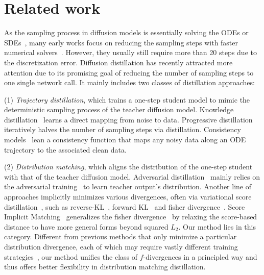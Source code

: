 \section{Related work}
\vspace{-3pt}

As the sampling process in diffusion models is essentially solving the ODEs or SDEs~\citep{song2020score}, many early works focus on reducing the sampling steps with faster numerical solvers~\citep{Song2020DenoisingDI,lu2022dpmp,Karras2022ElucidatingTD,liu2022pseudo,zheng2024dpm}. However, they usually still require more than 20 steps due to the discretization error. Diffusion distillation has recently attracted more attention due to its promising goal of reducing the number of sampling steps to one single network call. 
It mainly includes two classes of distillation approaches: 

(1) \emph{Trajectory distillation}, which trains a one-step student model to mimic the deterministic sampling process of the teacher diffusion model. Knowledge distillation~\citep{luhman2021knowledge,zheng2022fast} learns a direct mapping from noise to data. Progressive distillation~\cite{salimans2022progressive,meng2023distillation} iteratively halves the number of sampling steps via distillation. Consistency models~\citep{song2023consistency,song2023improved,geng2024consistency,lee2024truncated,lu2024simplifying} lean a consistency function that maps any noisy data along an ODE trajectory to the associated clean data. 

(2) \emph{Distribution matching}, which aligns the distribution of the one-step student with that of the teacher diffusion model. 
Adversarial distillation~\citep{sauer2023adversarial,sauer2024fast,xu2024ufogen} mainly relies on the adversarial training~\citep{goodfellow2014generative} to learn teacher output's distribution. Another line of approaches implicitly minimizes various divergences, often via variational score distillation~\citep{wang2024prolificdreamer}, such as reverse-KL~\citep{yin2024one,yin2024improved}, forward KL~\citep{luo2024diff,xie2024distillation} and fisher divergence~\citep{zhou2024score}. Score Implicit Matching~\citep{luo2024one} generalizes the fisher divergence~\citep{zhou2024score} by relaxing the score-based distance to have more general forms beyond squared $L_2$. Our method lies in this category. Different from previous methods that only minimize a particular distribution divergence, each of which may require vastly different training strategies~\citep{yin2024improved,xie2024distillation,zhou2024score}, our method unifies the class of $f$-divergences in a principled way and thus offers better flexibility in distribution matching distillation.



